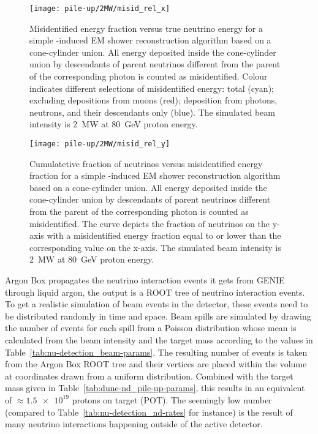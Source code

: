 \begin{figure}[htb]
	\centering
	\texttt{[image: pile-up/2MW/misid\_rel\_x]}
	\caption{Misidentified energy fraction versus true neutrino energy for a simple \Pgpz-induced EM shower reconstruction algorithm based on a cone-cylinder union.
		All energy deposited inside the cone-cylinder union by descendants of parent neutrinos different from the parent of the corresponding \Pgpz photon is counted as misidentified.
		Colour indicates different selections of misidentified energy: total (cyan); excluding depositions from muons (red); deposition from photons, neutrons, and their descendants only (blue).
		The simulated beam intensity is \SI{2}{\mega\watt} at \SI{80}{\giga\electronvolt} proton energy.}
	\label{fig:dune-nd_2MW_misid-rel-x}
\end{figure}

\begin{figure}[htb]
	\centering
	\texttt{[image: pile-up/2MW/misid\_rel\_y]}
	\caption{Cumulatetive fraction of neutrinos versus misidentified energy fraction for a simple \Pgpz-induced EM shower reconstruction algorithm based on a cone-cylinder union.
		All energy deposited inside the cone-cylinder union by descendants of parent neutrinos different from the parent of the corresponding \Pgpz photon is counted as misidentified.
		The curve depicts the fraction of neutrinos on the y-axis with a misidentified energy fraction equal to or lower than the corresponding value on the x-axis.
		The simulated beam intensity is \SI{2}{\mega\watt} at \SI{80}{\giga\electronvolt} proton energy.}
	\label{fig:dune-nd_2MW_misid-rel-y}
\end{figure}

Argon Box propagates the neutrino interaction events it gets from GENIE through liquid argon, the output is a ROOT tree of neutrino interaction events.
To get a realistic simulation of beam events in the detector, these events need to be distributed randomly in time and space.
Beam spills are simulated by drawing the number of events for each spill from a Poisson distribution whose mean is calculated from the beam intensity and the target mass according to the values in Table~\ref{tab:nu-detection_beam-params}.
The resulting number of events is taken from the Argon Box ROOT tree and their vertices are placed within the \lar{} volume at coordinates drawn from a uniform distribution.
Combined with the target mass given in Table~\ref{tab:dune-nd_pile-up-params}, this results in an equivalent of $\approx \num{1.5e19}$ protons on target (POT).
The seemingly low number (compared to Table~\ref{tab:nu-detection_nd-rates} for instance) is the result of many neutrino interactions happening outside of the active detector.

